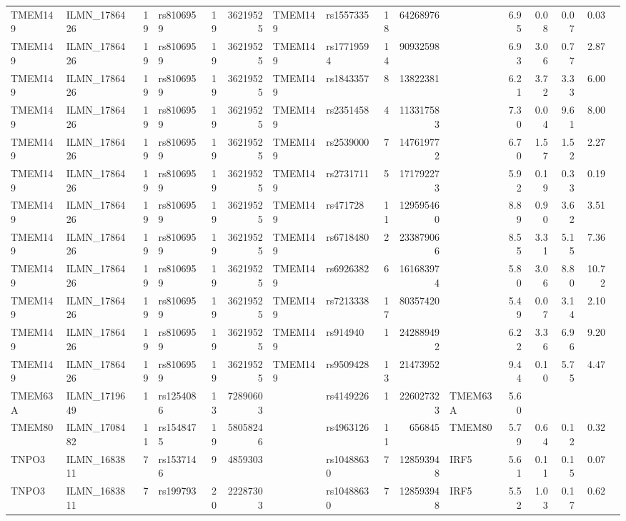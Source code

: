 \documentclass{article}
\begin{document}
\begin{landscape}
{\begin{ThreePartTable}
\begin{longtable}{|llr|lrrl|lrrl|rrrr|r|}
  TMEM149 & ILMN\_1786426 & 19 & rs8106959 & 19 & 36219525 & TMEM149 & rs1557335 & 18 & 64268976 &  & 6.95 & 0.08 & 0.07 & 0.03 &  \\
  TMEM149 & ILMN\_1786426 & 19 & rs8106959 & 19 & 36219525 & TMEM149 & rs17719594 & 14 & 90932598 &  & 6.93 & 3.06 & 0.77 & 2.87 &  \\
  TMEM149 & ILMN\_1786426 & 19 & rs8106959 & 19 & 36219525 & TMEM149 & rs1843357 & 8 & 13822381 &  & 6.21 & 3.72 & 3.33 & 6.00 &  \\
  TMEM149 & ILMN\_1786426 & 19 & rs8106959 & 19 & 36219525 & TMEM149 & rs2351458 & 4 & 113317583 &  & 7.30 & 0.04 & 9.61 & 8.00 &  \\
  TMEM149 & ILMN\_1786426 & 19 & rs8106959 & 19 & 36219525 & TMEM149 & rs2539000 & 7 & 147619772 &  & 6.70 & 1.57 & 1.52 & 2.27 &  \\
  TMEM149 & ILMN\_1786426 & 19 & rs8106959 & 19 & 36219525 & TMEM149 & rs2731711 & 5 & 171792273 &  & 5.92 & 0.19 & 0.33 & 0.19 &  \\
  TMEM149 & ILMN\_1786426 & 19 & rs8106959 & 19 & 36219525 & TMEM149 & rs471728 & 11 & 129595460 &  & 8.89 & 0.90 & 3.62 & 3.51 &  \\
  TMEM149 & ILMN\_1786426 & 19 & rs8106959 & 19 & 36219525 & TMEM149 & rs6718480 & 2 & 233879066 &  & 8.55 & 3.31 & 5.15 & 7.36 &  \\
  TMEM149 & ILMN\_1786426 & 19 & rs8106959 & 19 & 36219525 & TMEM149 & rs6926382 & 6 & 161683974 &  & 5.80 & 3.06 & 8.80 & 10.72 &  \\
  TMEM149 & ILMN\_1786426 & 19 & rs8106959 & 19 & 36219525 & TMEM149 & rs7213338 & 17 & 80357420 &  & 5.49 & 0.07 & 3.14 & 2.10 &  \\
  TMEM149 & ILMN\_1786426 & 19 & rs8106959 & 19 & 36219525 & TMEM149 & rs914940 & 1 & 242889492 &  & 6.22 & 3.36 & 6.96 & 9.20 &  \\
  TMEM149 & ILMN\_1786426 & 19 & rs8106959 & 19 & 36219525 & TMEM149 & rs9509428 & 13 & 21473952 &  & 9.44 & 0.10 & 5.75 & 4.47 &  \\
  TMEM63A & ILMN\_1719649 & 1 & rs1254086 & 13 & 72890603 &  & rs4149226 & 1 & 226027323 & TMEM63A & 5.60 &  &  &  &  \\
  TMEM80 & ILMN\_1708482 & 11 & rs1548475 & 19 & 58058246 &  & rs4963126 & 11 & 656845 & TMEM80 & 5.79 & 0.64 & 0.12 & 0.32 &  \\
  TNPO3 & ILMN\_1683811 & 7 & rs1537146 & 9 & 4859303 &  & rs10488630 & 7 & 128593948 & IRF5 & 5.61 & 0.11 & 0.15 & 0.07 &  \\
  TNPO3 & ILMN\_1683811 & 7 & rs199793 & 20 & 22287303 &  & rs10488630 & 7 & 128593948 & IRF5 & 5.52 & 1.03 & 0.17 & 0.62 &  \\

\end{longtable}
\end{ThreePartTable}}
\end{landscape}
\end{document}
